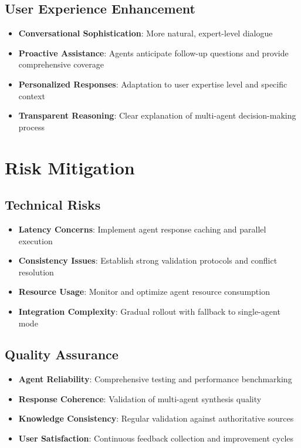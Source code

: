 \documentclass[11pt, a4paper]{article}
\begin{document}
\subsection{User Experience Enhancement}
\begin{itemize}
    \item \textbf{Conversational Sophistication}: More natural, expert-level dialogue
    \item \textbf{Proactive Assistance}: Agents anticipate follow-up questions and provide comprehensive coverage
    \item \textbf{Personalized Responses}: Adaptation to user expertise level and specific context
    \item \textbf{Transparent Reasoning}: Clear explanation of multi-agent decision-making process
\end{itemize}

\section{Risk Mitigation}

\subsection{Technical Risks}
\begin{itemize}
    \item \textbf{Latency Concerns}: Implement agent response caching and parallel execution
    \item \textbf{Consistency Issues}: Establish strong validation protocols and conflict resolution
    \item \textbf{Resource Usage}: Monitor and optimize agent resource consumption
    \item \textbf{Integration Complexity}: Gradual rollout with fallback to single-agent mode
\end{itemize}

\subsection{Quality Assurance}
\begin{itemize}
    \item \textbf{Agent Reliability}: Comprehensive testing and performance benchmarking
    \item \textbf{Response Coherence}: Validation of multi-agent synthesis quality
    \item \textbf{Knowledge Consistency}: Regular validation against authoritative sources
    \item \textbf{User Satisfaction}: Continuous feedback collection and improvement cycles
\end{itemize}
\end{document}
